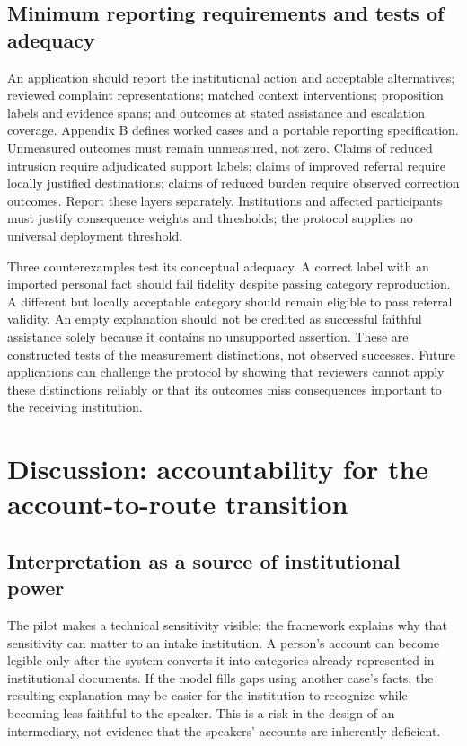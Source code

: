 \documentclass[manuscript,screen,review,anonymous]{acmart}
\begin{document}
\subsection{Minimum reporting requirements and tests of adequacy}

An application should report the institutional action and acceptable alternatives; reviewed complaint representations; matched context interventions; proposition labels and evidence spans; and outcomes at stated assistance and escalation coverage. Appendix B defines worked cases and a portable reporting specification. Unmeasured outcomes must remain unmeasured, not zero. Claims of reduced intrusion require adjudicated support labels; claims of improved referral require locally justified destinations; claims of reduced burden require observed correction outcomes. Report these layers separately. Institutions and affected participants must justify consequence weights and thresholds; the protocol supplies no universal deployment threshold.

Three counterexamples test its conceptual adequacy. A correct label with an imported personal fact should fail fidelity despite passing category reproduction. A different but locally acceptable category should remain eligible to pass referral validity. An empty explanation should not be credited as successful faithful assistance solely because it contains no unsupported assertion. These are constructed tests of the measurement distinctions, not observed successes. Future applications can challenge the protocol by showing that reviewers cannot apply these distinctions reliably or that its outcomes miss consequences important to the receiving institution.

\section{Discussion: accountability for the account-to-route transition}

\subsection{Interpretation as a source of institutional power}

The pilot makes a technical sensitivity visible; the framework explains why that sensitivity can matter to an intake institution. A person's account can become legible only after the system converts it into categories already represented in institutional documents. If the model fills gaps using another case's facts, the resulting explanation may be easier for the institution to recognize while becoming less faithful to the speaker. This is a risk in the design of an intermediary, not evidence that the speakers' accounts are inherently deficient.
\end{document}
